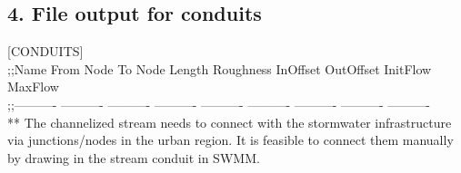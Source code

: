 \documentclass[]{article}
\newenvironment{Shaded}{\begin{snugshade}}{\end{snugshade}}
\newcommand{\CommentTok}[1]{\textcolor[rgb]{0.56,0.35,0.01}{\textit{#1}}}
\newcommand{\DataTypeTok}[1]{\textcolor[rgb]{0.13,0.29,0.53}{#1}}
\newcommand{\DecValTok}[1]{\textcolor[rgb]{0.00,0.00,0.81}{#1}}
\newcommand{\FloatTok}[1]{\textcolor[rgb]{0.00,0.00,0.81}{#1}}
\newcommand{\KeywordTok}[1]{\textcolor[rgb]{0.13,0.29,0.53}{\textbf{#1}}}
\newcommand{\NormalTok}[1]{#1}
\newcommand{\OperatorTok}[1]{\textcolor[rgb]{0.81,0.36,0.00}{\textbf{#1}}}
\newcommand{\StringTok}[1]{\textcolor[rgb]{0.31,0.60,0.02}{#1}}
\begin{document}
\begin{Shaded}
\end{Shaded}

\hypertarget{file-output-for-conduits}{%
\subsection{4. File output for
conduits}\label{file-output-for-conduits}}

{[}CONDUITS{]}\\
;;Name From Node To Node Length Roughness InOffset OutOffset InitFlow
MaxFlow\\
;;---------- ---------- ---------- ---------- ---------- ----------
---------- ---------- ----------\\
** The channelized stream needs to connect with the stormwater
infrastructure via junctions/nodes in the urban region. It is feasible
to connect them manually by drawing in the stream conduit in SWMM.
\end{document}
